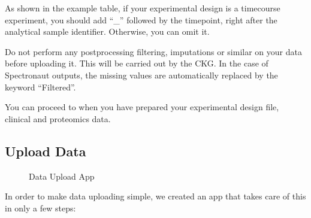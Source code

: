 \documentclass[letterpaper,10pt,english]{sphinxmanual}
\begin{document}
As shown in the example table, if your experimental design is a timecourse experiment, you should add “\_” followed by the timepoint, right after the analytical sample identifier. Otherwise, you can omit it.

Do not perform any post\sphinxhyphen{}processing filtering, imputations or similar on your data before uploading it. This will be carried out by the CKG. In the case of Spectronaut outputs, the missing values are automatically replaced by the keyword “Filtered”.

You can proceed to {\hyperref[\detokenize{getting_started/upload-data:upload}]{}} when you have prepared your experimental design file, clinical and proteomics data.


\subsection{Upload Data}
\label{\detokenize{getting_started/upload-data:upload}}\label{\detokenize{getting_started/upload-data:id2}}
\begin{figure}[htbp]
\centering
\capstart

\noindent{}
\caption{Data Upload App}\label{\detokenize{getting_started/upload-data:id5}}\end{figure}

In order to make data uploading simple, we created an app that takes care of this in only a few steps:
\end{document}
